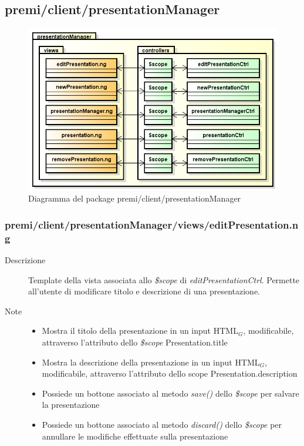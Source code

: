 \clearpage
\subsection{premi/client/presentationManager}
\begin{figure}[H]
\begin{center}
\includegraphics[scale=0.50]{img/diapkg/presentationManager.png}
\caption{Diagramma del package premi/client/presentationManager}
\end{center}
\end{figure}











\subsubsection{premi/client/presentationManager/views/editPresentation.ng}

\begin{description}
\item[Descrizione] \hfill
	Template della vista associata allo \textit{\$scope} di \textit{editPresentationCtrl}. Permette all'utente di modificare titolo e descrizione di una presentazione.
\item[Note] \hfill
	\begin{itemize}
			\item Mostra il titolo della presentazione in un input HTML$_G$, modificabile, attraverso l'attributo dello \textit{\$scope} Presentation.title
			\item Mostra la descrizione della presentazione in un input HTML$_G$, modificabile, attraverso l'attributo dello scope Presentation.description
			\item Possiede un bottone associato al metodo \textit{save()} dello \textit{\$scope} per salvare la presentazione
			\item Possiede un bottone associato al metodo \textit{discard()} dello \textit{\$scope} per annullare le modifiche effettuate sulla presentazione
	\end{itemize}
\end{description}

